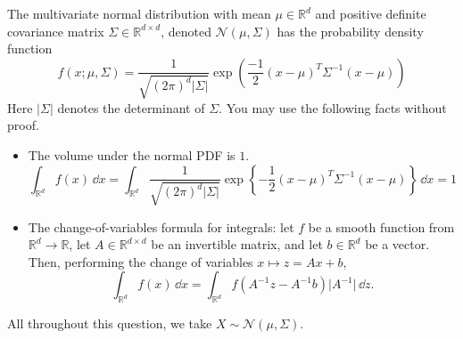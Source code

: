 \documentclass{article}
\begin{document}
    The multivariate normal distribution with mean $\mu \in \mathbb{R}^{d}$ and positive definite covariance matrix $\Sigma \in \mathbb{R}^{d \times d}$, denoted $\mathcal{N}(\mu, \Sigma)$ has the probability density function
        \begin{equation*}
            f(x; \mu, \Sigma) = \dfrac{1}{\sqrt{(2\pi)^{d} \lvert \Sigma \rvert}} \exp\left(\dfrac{-1}{2}(x - \mu)^{T}\Sigma^{-1}(x - \mu)\right)
        \end{equation*}
    Here $\lvert \Sigma \rvert$ denotes the determinant of $\Sigma$. You may use the following facts without proof.
        \begin{itemize}
            \item The volume under the normal PDF is $1$.
                \begin{equation*}
                    \int_{\mathbb{R}^{d}}^{} f(x) \, \dd{x}  = \int_{\mathbb{R}^{d}}^{} \dfrac{1}{\sqrt{(2\pi)^{d} \lvert \Sigma \rvert}} \exp\left\{-\dfrac{1}{2} (x - \mu)^{T} \Sigma^{-1} (x - \mu)\right\} \, \dd{x} = 1
                \end{equation*}

            \item The change-of-variables formula for integrals: let $f$ be a smooth function from $\mathbb{R}^{d} \rightarrow \mathbb{R}$, let $A \in \mathbb{R}^{d \times d}$ be an invertible matrix, and let $b \in \mathbb{R}^{d}$ be a vector. Then, performing the change of variables $x \mapsto z = Ax + b$,
                \begin{equation*}
                    \int_{\mathbb{R}^{d}}^{} f(x) \, \dd{x}  = \int_{\mathbb{R}^{d}}^{} f(A^{-1}z - A^{-1}b)\lvert A^{-1} \rvert \, \dd{z}.
                \end{equation*}
        \end{itemize}
    All throughout this question, we take $X \sim \mathcal{N}(\mu, \Sigma)$.
\end{document}
